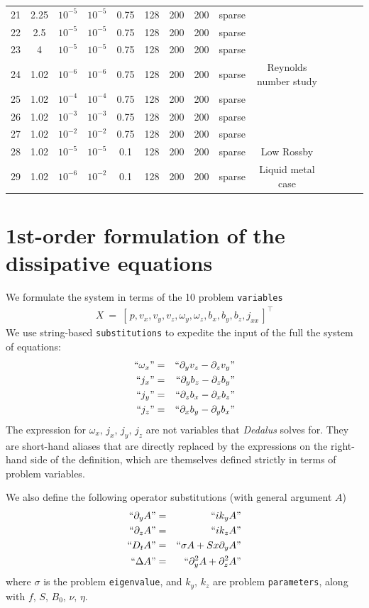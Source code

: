 \documentclass[aps,prl,preprint
,superscriptaddress]{revtex4-1}
\newcommand\Beq{\begin{eqnarray}}
\newcommand\Eeq{\end{eqnarray}}
\newcommand{\pd}[1]{\partial_{#1}}
\begin{document}
\begin{tabular}{cccccccccccccc}
21 & 2.25   & $10^{-5}$ & $10^{-5}$ & 0.75 & 128 & 200 & 200 & sparse & \\
22 & 2.5    & $10^{-5}$ & $10^{-5}$ & 0.75 & 128 & 200 & 200 & sparse & \\
23 & 4      & $10^{-5}$ & $10^{-5}$ & 0.75 & 128 & 200 & 200 & sparse & \\
24 & 1.02   & $10^{-6}$ & $10^{-6}$ & 0.75 & 128 & 200 & 200 & sparse & Reynolds number study\\
25 & 1.02   & $10^{-4}$ & $10^{-4}$ & 0.75 & 128 & 200 & 200 & sparse & \\
26 & 1.02   & $10^{-3}$ & $10^{-3}$ & 0.75 & 128 & 200 & 200 & sparse & \\
27 & 1.02   & $10^{-2}$ & $10^{-2}$ & 0.75 & 128 & 200 & 200 & sparse & \\
28 & 1.02   & $10^{-5}$ & $10^{-5}$ & 0.1  & 128 & 200 & 200 & sparse & Low Rossby\\ 
29 & 1.02   & $10^{-6}$ & $10^{-2}$ & 0.1  & 128 & 200 & 200 & sparse & Liquid metal case\\ 
\end{tabular}

\section{1st-order formulation of the dissipative equations}
\label{sec:formulation}

We formulate the system in terms of the 10 problem \texttt{variables} 
\Beq
X \ = \ \left[\,p,v_{x},v_{y},v_{z},\omega_{y},\omega_{z},b_{x},b_{y},b_{z},j_{xx}\,\right]^{\top} \nonumber
\Eeq
We use string-based \texttt{substitutions} to expedite the input of the full the system of equations: 
\Beq
``\omega_{x}" &=& ``\pd{y} v_{z} - \pd{z} v_{y}" \nonumber \\
``j_{x}" &=& ``\pd{y} b_{z} - \pd{z} b_{y}" \nonumber \\
``j_{y}" &=& ``\pd{z} b_{x} - \pd{x} b_{z}" \nonumber \\
``j_{z}" &=& ``\pd{x} b_{y} - \pd{y} b_{x}" \nonumber 
\Eeq
The expression for $\omega_{x},\,j_{x},\,j_{y},\,j_{z}$ are not variables that \textit{Dedalus} solves for. 
They are short-hand aliases that are directly replaced by the expressions on the right-hand side of the definition, which are themselves defined strictly in terms of problem variables. 

We also define the following operator substitutions (with general argument $A$)
\Beq
``\pd{y} A" &=& ``i k_{y} A" \nonumber \\
``\pd{z} A" &=& ``i k_{z} A" \nonumber \\
``D_{t} A" &=& ``\sigma A +S x \pd{y} A " \nonumber \\
``\Delta A" &=& ``\pd{y}^{2} A + \pd{z}^{2}A" \nonumber
\Eeq
where $\sigma$ is the problem \texttt{eigenvalue}, and $k_{y},\,k_{z}$ are problem \texttt{parameters}, along with $f,\,S,\,B_{0},\, \nu,\, \eta$. 
\end{document}

